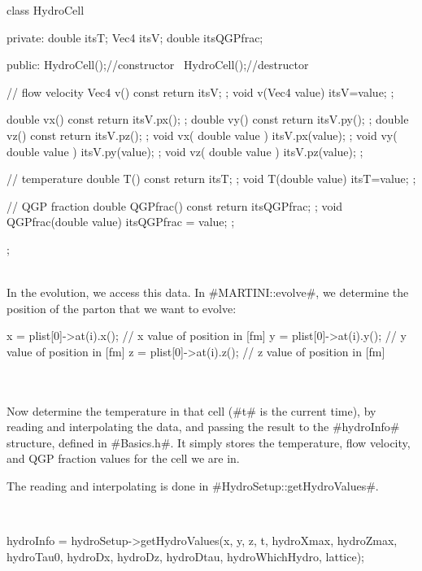 \begin{boxedverbatim}
class HydroCell
{
 private:
  double itsT;
  Vec4   itsV;
  double itsQGPfrac;

 public:
  HydroCell(){};//constructor
  ~HydroCell(){};//destructor

  // flow velocity
  Vec4 v() const { return itsV; };
  void v(Vec4 value) { itsV=value; };

  double vx() const { return itsV.px(); };
  double vy() const { return itsV.py(); };
  double vz() const { return itsV.pz(); };
  void vx( double value ) { itsV.px(value); };
  void vy( double value ) { itsV.py(value); };
  void vz( double value ) { itsV.pz(value); };

  // temperature
  double T() const { return itsT; };
  void T(double value) { itsT=value; };

  // QGP fraction
  double QGPfrac() const { return itsQGPfrac; };
  void QGPfrac(double value) { itsQGPfrac = value; };
};
\end{boxedverbatim}
 
~\\
In the evolution, we access this data. In #MARTINI::evolve#, we determine the position of the parton that we want to evolve:\\

\begin{boxedverbatim}
x = plist[0]->at(i).x();                    // x value of position in [fm]
y = plist[0]->at(i).y();                    // y value of position in [fm]
z = plist[0]->at(i).z();                    // z value of position in [fm]
\end{boxedverbatim}\\

~\\
Now determine the temperature in that cell (#t# is the current time), by reading
and interpolating the data, and passing the result to the #hydroInfo# structure,
defined in #Basics.h#. It simply stores the temperature, flow velocity, and QGP
fraction values for the cell we are in. 

The reading and interpolating is done in #HydroSetup::getHydroValues#.

~\\
\begin{boxedverbatim}
hydroInfo = hydroSetup->getHydroValues(x, y, z, t, hydroXmax, hydroZmax, hydroTau0, 
                                       hydroDx, hydroDz, hydroDtau, hydroWhichHydro, 
                                       lattice);

\end{boxedverbatim}\\

